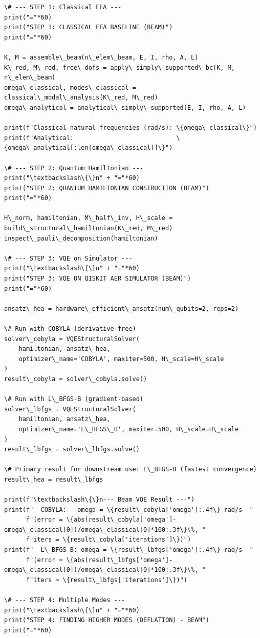 \documentclass[12pt, a4paper]{article}
\begin{document}
\begin{lstlisting}[style=codestyle, caption={{main.py --- Pipeline Orchestrator}}]
\# --- STEP 1: Classical FEA ---
print("="*60)
print("STEP 1: CLASSICAL FEA BASELINE (BEAM)")
print("="*60)

K, M = assemble\_beam(n\_elem\_beam, E, I, rho, A, L)
K\_red, M\_red, free\_dofs = apply\_simply\_supported\_bc(K, M, n\_elem\_beam)
omega\_classical, modes\_classical = classical\_modal\_analysis(K\_red, M\_red)
omega\_analytical = analytical\_simply\_supported(E, I, rho, A, L)

print(f"Classical natural frequencies (rad/s): \{omega\_classical\}")
print(f"Analytical:                            \{omega\_analytical[:len(omega\_classical)]\}")

\# --- STEP 2: Quantum Hamiltonian ---
print("\textbackslash\{\}n" + "="*60)
print("STEP 2: QUANTUM HAMILTONIAN CONSTRUCTION (BEAM)")
print("="*60)

H\_norm, hamiltonian, M\_half\_inv, H\_scale = build\_structural\_hamiltonian(K\_red, M\_red)
inspect\_pauli\_decomposition(hamiltonian)

\# --- STEP 3: VQE on Simulator ---
print("\textbackslash\{\}n" + "="*60)
print("STEP 3: VQE ON QISKIT AER SIMULATOR (BEAM)")
print("="*60)

ansatz\_hea = hardware\_efficient\_ansatz(num\_qubits=2, reps=2)

\# Run with COBYLA (derivative-free)
solver\_cobyla = VQEStructuralSolver(
    hamiltonian, ansatz\_hea,
    optimizer\_name='COBYLA', maxiter=500, H\_scale=H\_scale
)
result\_cobyla = solver\_cobyla.solve()

\# Run with L\_BFGS-B (gradient-based)
solver\_lbfgs = VQEStructuralSolver(
    hamiltonian, ansatz\_hea,
    optimizer\_name='L\_BFGS\_B', maxiter=500, H\_scale=H\_scale
)
result\_lbfgs = solver\_lbfgs.solve()

\# Primary result for downstream use: L\_BFGS-B (fastest convergence)
result\_hea = result\_lbfgs

print(f"\textbackslash\{\}n--- Beam VQE Result ---")
print(f"  COBYLA:   omega = \{result\_cobyla['omega']:.4f\} rad/s  "
      f"(error = \{abs(result\_cobyla['omega']-omega\_classical[0])/omega\_classical[0]*100:.3f\}\%, "
      f"iters = \{result\_cobyla['iterations']\})")
print(f"  L\_BFGS-B: omega = \{result\_lbfgs['omega']:.4f\} rad/s  "
      f"(error = \{abs(result\_lbfgs['omega']-omega\_classical[0])/omega\_classical[0]*100:.3f\}\%, "
      f"iters = \{result\_lbfgs['iterations']\})")

\# --- STEP 4: Multiple Modes ---
print("\textbackslash\{\}n" + "="*60)
print("STEP 4: FINDING HIGHER MODES (DEFLATION) - BEAM")
print("="*60)


\end{lstlisting}
\end{document}
